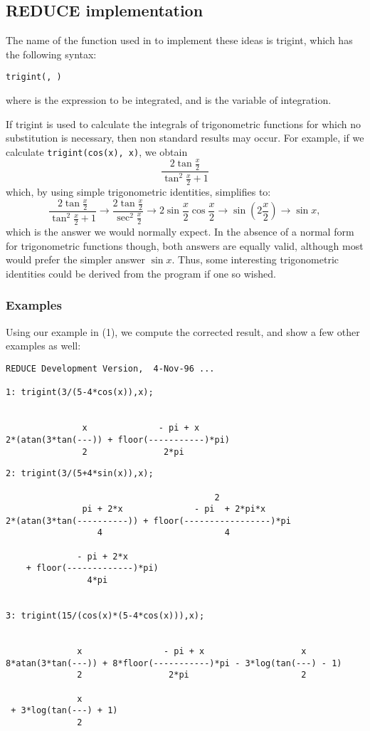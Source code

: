 \subsection{REDUCE implementation}
\hypertarget{operator:TRIGINT}{}
The name of the function used in \REDUCE to implement these ideas is trigint, which has the following syntax:
\begin{syntax}
  \texttt{trigint(, )}
\end{syntax}
where  is the expression to be integrated, and  is the variable of integration.

If trigint is used to calculate the integrals of trigonometric functions for which no substitution is necessary, then non standard results may occur. For example, if we calculate
\texttt{trigint(cos(x), x)},
we obtain
\[ \frac{2\tan\frac{x}{2}}{\tan^{2}\frac{x}{2}+1} \]
which, by using simple trigonometric identities, simplifies to:
\[ \frac{2\tan\frac{x}{2}}{\tan^{2}\frac{x}{2}+1} \rightarrow \frac{2\tan\frac{x}{2}}{\sec^{2}\frac{x}{2}} \rightarrow 2\sin\frac{x}{2}\cos\frac{x}{2} \rightarrow \sin \left(2\frac{x}{2}\right) \rightarrow \sin x, \]
which is the answer we would normally expect. In the absence of a
normal form for trigonometric functions though, both answers are
equally valid, although most would prefer the simpler answer $\sin
x$. Thus, some interesting trigonometric identities could be derived
from the program if one so wished.

\subsubsection{Examples}
Using our example in (1), we compute the corrected result, and show a few other examples as well:
\begin{verbatim}
REDUCE Development Version,  4-Nov-96 ...

1: trigint(3/(5-4*cos(x)),x);


               x              - pi + x
2*(atan(3*tan(---)) + floor(-----------)*pi)
               2               2*pi
\end{verbatim}

\begin{verbatim}
2: trigint(3/(5+4*sin(x)),x);

                                         2
               pi + 2*x              - pi  + 2*pi*x
2*(atan(3*tan(----------)) + floor(-----------------)*pi
                  4                        4

              - pi + 2*x
    + floor(-------------)*pi)
                4*pi


3: trigint(15/(cos(x)*(5-4*cos(x))),x);


              x                - pi + x                   x
8*atan(3*tan(---)) + 8*floor(-----------)*pi - 3*log(tan(---) - 1)
              2                 2*pi                      2

              x
 + 3*log(tan(---) + 1)
              2
\end{verbatim}
